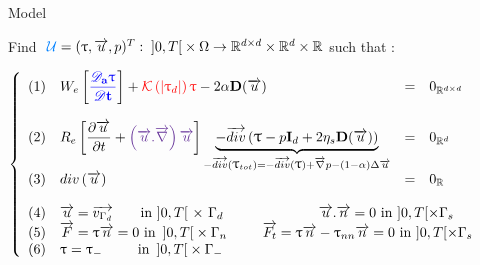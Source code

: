 \begin{frame}{Model}

\scriptsize
Find $\stress{\ \mathcal{U}} = (\Tau,\v, p)^T : \; \left]0,T\right[ \times \Omega \rightarrow \mathbb{R}^{d\times d} \times \mathbb{R}^d \times \mathbb{R}$ such that :

\vfill
$
   \left\{
       \begin{array}{l l l l}
           
           (1)& 
           W_e\left[\textcolor{blue}{\tensor{\od{\Tau}{t}}}\right] 
           + \textcolor{red}{\mathcal{K} \left( | \Tau_d | \right) \Tau} - 2\alpha \tensor{D(\v)}&
           =& 0_{\mathbb{R}^{d \times d}} \\
           
           \\

           (2)&
           R_e\left[ \pd{\v}{t} + 
           \textcolor{RoyalPurple}{\left(\v . \grad \right) \v} \right] 
           \underbrace{-\divv{\Tau -p\tensor{I}_d+2\eta_s\tensor{D(\v)}}}_{ -\divv{\Tau_{tot}} = -\divv{\Tau} + \grad p - (1-\alpha)\Delta\v}&
           =& 0_{\mathbb{R}^d} \\

           (3)& \div{\v} &=& 0_\mathbb{R} \\

           \\

           (4)& 
           \multicolumn{3}{l}{
           \v = \vector{v_{\Gamma_d}} \hskip 0.58cm \textrm{ in } ]0,T[\ \times\ \Gamma_d
           \hskip 2.4cm \v . \vector{n} = 0\textrm{ in } ]0,T[ \times \Gamma_s
           } \\
           
           (5)&
           \multicolumn{3}{l}{
           \vector{F} = \Tau \vector{n} = 0 \textrm{ in } \left]0,T\right[ \times \Gamma_n
           \hskip 0.9cm 
           \vector{F_t} = \Tau \vector{n} - \Tau_{nn} \vector{n} = 0 \textrm{ in } ]0,T[ \times \Gamma_s
           } \\

           (6)&
           \multicolumn{3}{l}{
           \Tau = \Tau_- \hskip 0.775cm \textrm{ in } \left]0,T\right[ \times \Gamma_-
           } \\
       \end{array}
   \right.
$
\vfill

\end{frame}



